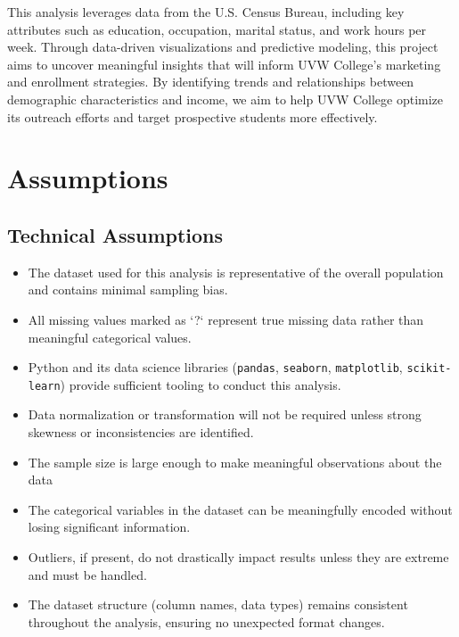 \documentclass[journal,onecolumn]{IEEEtran}
\begin{document}
This analysis leverages data from the U.S. Census Bureau, including key attributes
such as education, occupation, marital status, and work hours per week. Through
data-driven visualizations and predictive modeling, this project aims to uncover
meaningful insights that will inform UVW College’s marketing and enrollment strategies.
By identifying trends and relationships between demographic characteristics and income,
we aim to help UVW College optimize its outreach efforts and target prospective
students more effectively.

\section{Assumptions}

\subsection{Technical Assumptions}
\begin{itemize}
    \item The dataset used for this analysis is representative of the overall population and contains minimal sampling bias.
    \item All missing values marked as `?` represent true missing data rather than meaningful categorical values.
    \item Python and its data science libraries (\texttt{pandas}, \texttt{seaborn}, \texttt{matplotlib}, \texttt{scikit-learn}) provide sufficient tooling to conduct this analysis.
    \item Data normalization or transformation will not be required unless strong skewness or inconsistencies are identified.
    \item The sample size is large enough to make meaningful observations about the data
    \item The categorical variables in the dataset can be meaningfully encoded without losing significant information.
    \item Outliers, if present, do not drastically impact results unless they are extreme and must be handled.
    \item The dataset structure (column names, data types) remains consistent throughout the analysis, ensuring no unexpected format changes.
\end{itemize}
\end{document}
